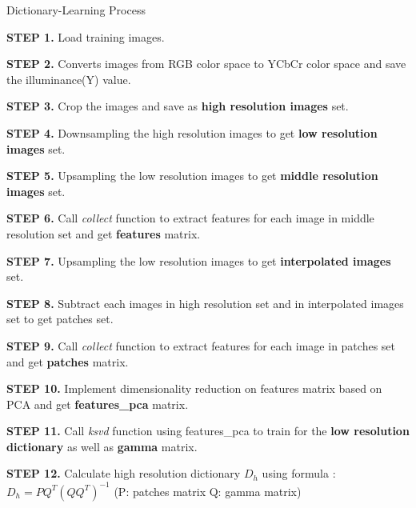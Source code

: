 \documentclass[english]{cccconf}
\begin{document}
	\begin{algorithm}[H]
		\caption{Dictionary-Learning Process} 
		\label{alg1}
		\begin{algorithmic}
			\STATE \textbf{STEP  1.} Load training images.
			
			\STATE \textbf{STEP  2.} Converts images from RGB color space to YCbCr color space and save the illuminance(Y) value.
			
			\STATE \textbf{STEP  3.} Crop the images and save as \textbf{high resolution images} set.
			
			\STATE \textbf{STEP  4.} Downsampling the high resolution images to get \textbf{low resolution images} set.
			
			\STATE \textbf{STEP  5.} Upsampling the low resolution images to get \textbf{middle resolution images} set.
			
			\STATE \textbf{STEP  6.} Call \textit{collect} function to extract features for each image in middle resolution set and get \textbf{features} matrix.
			
			\STATE \textbf{STEP  7.} Upsampling the low resolution images to get  \textbf{interpolated images} set.
			
			\STATE \textbf{STEP  8.} Subtract each images in high resolution set and in interpolated images set to get patches set.
			
			\STATE \textbf{STEP  9.} Call \textit{collect} function to extract features for each image in patches set and get \textbf{patches} matrix.
			
			\STATE \textbf{STEP 10.} Implement dimensionality reduction on features matrix based on PCA and get \textbf{features\_pca} matrix.
			
			\STATE \textbf{STEP 11.} Call \textit{ksvd} function using features\_pca to train for the \textbf{low resolution dictionary} as well as \textbf{gamma} matrix.
			
			\STATE \textbf{STEP 12.} Calculate high resolution dictionary $D_h$ using formula : $D_h = PQ^T(QQ^T)^{-1}$  (P: patches matrix  Q: gamma matrix)
			
		\end{algorithmic}
	\end{algorithm}

\printbibliography
\end{document}
